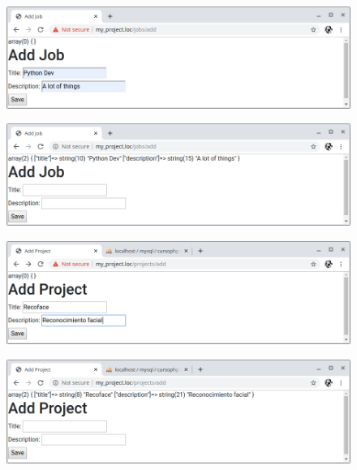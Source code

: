 \documentclass{article}
\begin{document}
\begin{figure}[h!]
  \centering
  \includegraphics[scale=0.5]{./Pictures/136_jobsadd_prueba.png}
\end{figure}

\newpage

\begin{figure}[h!]
  \centering
  \includegraphics[scale=0.5]{./Pictures/138_jobsadd_prueba.png}
\end{figure}

\begin{figure}[h!]
  \centering
  \includegraphics[scale=0.5]{./Pictures/139_projectsadd_prueba.png}
\end{figure}

\begin{figure}[h!]
  \centering
  \includegraphics[scale=0.5]{./Pictures/140_projectsadd_prueba.png}
\end{figure}
\end{document}
